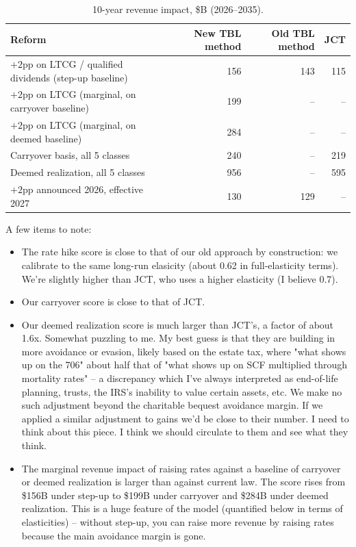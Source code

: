 \documentclass[11pt]{article}
\newcommand{\dyn}{New TBL method}
\newcommand{\oldm}{Old TBL method}
\begin{document}
\begin{table}[H]
\centering\small
\caption{10-year revenue impact, \$B (2026--2035).}
\label{tab:scores}
\begin{tabular}{lrrr}
\toprule
Reform                                                  & \dyn  & \oldm & JCT  \\
\midrule
$+2$pp on LTCG / qualified dividends (step-up baseline) & 156   & 143   & 115  \\
$+2$pp on LTCG (marginal, on carryover baseline)        & 199   & --    & --   \\
$+2$pp on LTCG (marginal, on deemed baseline)           & 284   & --    & --   \\
Carryover basis, all 5 classes                          & 240   & --    & 219  \\
Deemed realization, all 5 classes                       & 956   & --    & 595  \\
$+2$pp announced 2026, effective 2027                   & 130   & 129   & --   \\
\bottomrule
\end{tabular}
\end{table}

A few items to note: 
\begin{itemize}

\item{The rate hike score is close to that of our old approach by construction: we calibrate to the same long-run elasicity (about 0.62 in full-elasticity terms). We're slightly higher than JCT, who uses a higher elasticity (I believe 0.7).}

\item{Our carryover score is close to that of JCT.}

\item{Our deemed realization score is much larger than JCT's, a factor of about 1.6x. Somewhat puzzling to me. My best guess is that they are building in more avoidance or evasion, likely based on the estate tax, where "what shows up on the 706" about half that of "what shows up on SCF multiplied through mortality rates" -- a discrepancy which I've always interpreted as end-of-life planning, trusts, the IRS's inability to value certain assets, etc. We make no such adjustment beyond the charitable bequest avoidance margin. If we applied a similar adjustment to gains we'd be close to their number. I need to think about this piece. I think we should circulate to them and see what they think. }

\item{The marginal revenue impact of raising rates against a baseline of carryover or deemed realization is larger than against current law. The score rises from \$156B under step-up to \$199B under carryover and \$284B under deemed realization. This is a huge feature of the model (quantified below in terms of elasticities) -- without step-up, you can raise more revenue by raising rates because the main avoidance margin is gone.}

\end{itemize}
\end{document}

